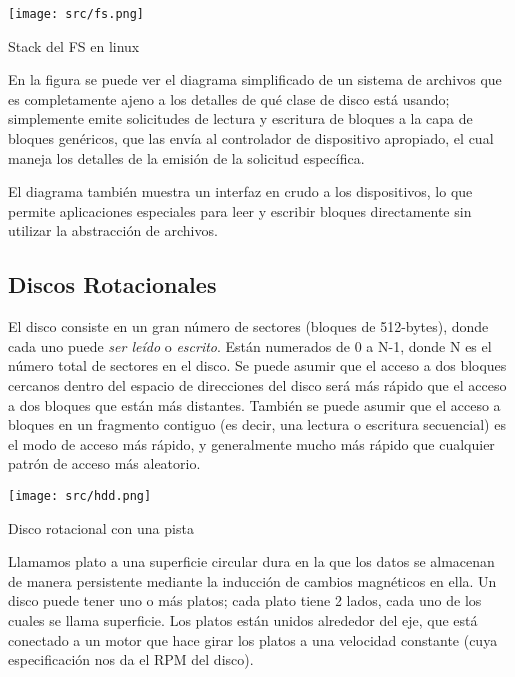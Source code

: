 \documentclass[openany]{book}
\begin{document}
\begin{floatingfigure}[r]{0.5\textwidth}
    \texttt{[image: src/fs.png]}
    \caption{Stack del FS en linux}
\end{floatingfigure}

En la figura se puede ver el diagrama simplificado de un sistema de archivos que es completamente ajeno a los detalles de qué clase de disco está usando; simplemente \colorbox{yellow!20}{emite solicitudes} de lectura y escritura de bloques a la capa de bloques genéricos, que las \colorbox{yellow!20}{envía al controlador} de dispositivo apropiado, el cual \colorbox{yellow!20}{maneja los detalles de la emisión} de la solicitud específica.

El diagrama también muestra un interfaz en crudo a los dispositivos, lo que permite aplicaciones especiales para leer y escribir bloques directamente sin utilizar la abstracción de archivos.

\newpage
\subsection{Discos Rotacionales}

El disco consiste en un gran número de \colorbox{yellow!20}{sectores} (bloques de 512-bytes), donde cada uno puede \textit{ser leído} o \textit{escrito}. Están numerados de \colorbox{yellow!20}{0 a N-1}, donde N es el número total de \colorbox{yellow!20}{sectores en el disco}. Se puede asumir que el acceso a dos bloques cercanos dentro del espacio de direcciones del disco será más rápido que el acceso a dos bloques que están más distantes. También se puede asumir que el acceso a bloques en un fragmento contiguo (es decir, una lectura o escritura secuencial) es el modo de acceso más rápido, y generalmente mucho más rápido que cualquier patrón de acceso más aleatorio.

\begin{floatingfigure}[l]{0.3\textwidth}
    \texttt{[image: src/hdd.png]}
    \caption{Disco rotacional con una pista}
\end{floatingfigure}

Llamamos \colorbox{yellow!20}{plato} a una superficie circular dura en la que los datos se almacenan de manera persistente mediante la inducción de cambios magnéticos en ella. Un disco puede tener uno o más platos; \colorbox{yellow!20}{cada plato tiene 2 lados}, cada uno de los cuales se llama \colorbox{yellow!20}{superficie}. Los platos están unidos alrededor del eje, que está conectado a un motor que hace girar los platos a una velocidad constante (cuya especificación nos da el \colorbox{yellow!20}{RPM} del disco). 
\end{document}

